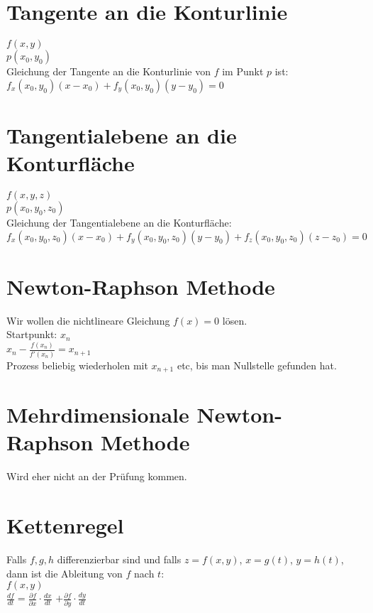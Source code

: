 \documentclass[../main.tex]{subfiles}
\begin{document}
\section{Tangente an die Konturlinie}
$f(x,y)$ \\
$p(x_0,y_0)$ \\ [7pt]
Gleichung der Tangente an die Konturlinie von $f$ im Punkt $p$ ist: \\ [7pt]
$f_x(x_0,y_0)(x-x_0)+f_y(x_0,y_0)(y-y_0) = 0$

\section{Tangentialebene an die Konturfläche}
$f(x,y,z)$ \\
$p(x_0,y_0,z_0)$ \\ [7pt]
Gleichung der Tangentialebene an die Konturfläche: \\ [7pt]
$f_x(x_0,y_0,z_0)(x-x_0)+f_y(x_0,y_0,z_0)(y-y_0)+f_z(x_0,y_0,z_0)(z-z_0)=0$

\section{Newton-Raphson Methode}
Wir wollen die nichtlineare Gleichung $f(x)=0$ lösen. \\
Startpunkt: $x_n$ \\ [7pt]
$x_n - \frac{f(x_n)}{f'(x_n)}=x_{n+1}$ \\ [7pt]
Prozess beliebig wiederholen mit $x_{n+1}$ etc, bis man Nullstelle gefunden hat.

\section{Mehrdimensionale Newton-Raphson Methode}
Wird eher nicht an der Prüfung kommen.

\section{Kettenregel}
Falls $f,g,h$ differenzierbar sind und falls $z=f(x,y)$, $x=g(t)$, $y=h(t)$, dann ist die Ableitung
von $f$ nach $t$: \\ [7pt]
$f(x,y)$ \\ [7pt]
$\frac{df}{dt} = \frac{\partial f}{\partial x} \cdot \frac{dx}{dt}$
$+\frac{\partial f}{\partial y}\cdot\frac{dy}{dt}$
\end{document}
